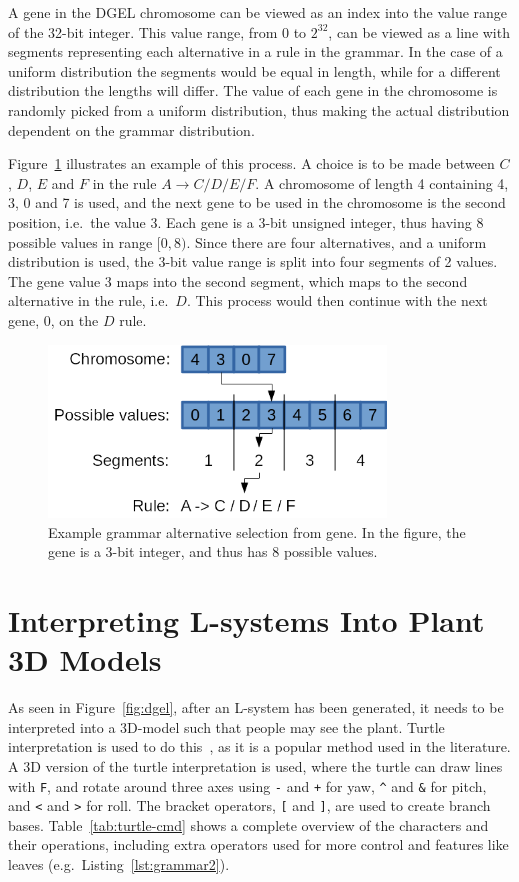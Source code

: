 A gene in the DGEL chromosome can be viewed as an index into the value range of the 32-bit integer.
This value range, from $0$ to $2^{32}$, can be viewed as a line with segments representing each alternative in a rule in the grammar.
In the case of a uniform distribution the segments would be equal in length, while for a different distribution the lengths will differ.
The value of each gene in the chromosome is randomly picked from a uniform distribution, thus making the actual distribution dependent on the grammar distribution.

Figure~\ref{fig:gene} illustrates an example of this process.
A choice is to be made between $C$, $D$, $E$ and $F$ in the rule $A \rightarrow C / D / E / F$.
A chromosome of length 4 containing 4, 3, 0 and 7 is used, and the next gene to be used in the chromosome is the second position, i.e.\ the value 3.
Each gene is a 3-bit unsigned integer, thus having 8 possible values in range $[0, 8)$.
Since there are four alternatives, and a uniform distribution is used, the 3-bit value range is split into four segments of 2 values.
The gene value 3 maps into the second segment, which maps to the second alternative in the rule, i.e.\ $D$.
This process would then continue with the next gene, 0, on the $D$ rule.

\begin{figure}
    \centering
    \includegraphics[width=0.8\textwidth]{figures/gene}
    \caption[Example grammar alternative selection from gene]{Example grammar alternative selection from gene. In the figure, the gene is a 3-bit integer, and thus has 8 possible values.}
    \label{fig:gene}
\end{figure}

\section{Interpreting L-systems Into Plant 3D Models}
As seen in Figure~\ref{fig:dgel}, after an L-system has been generated, it needs to be interpreted into a 3D-model such that people may see the plant.
Turtle interpretation is used to do this~\cite{2012Prusinkiewicz}, as it is a popular method used in the literature.
A 3D version of the turtle interpretation is used, where the turtle can draw lines with \texttt{F}, and rotate around three axes using \texttt{-} and \texttt{+} for yaw, \texttt{\textasciicircum} and \texttt{\&} for pitch, and \texttt{<} and \texttt{>} for roll.
The bracket operators, \texttt{[} and \texttt{]}, are used to create branch bases.
Table~\ref{tab:turtle-cmd} shows a complete overview of the characters and their operations, including extra operators used for more control and features like leaves (e.g.\ Listing~\ref{lst:grammar2}).

